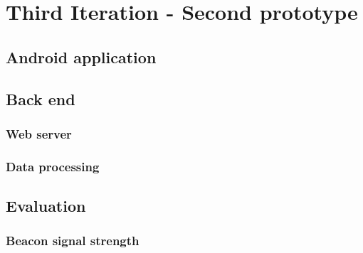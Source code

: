 \documentclass[../Main/thesis.tex]{subfiles}
\begin{document}
\chapter{Third Iteration  - Second prototype}
\label{ch:development-1}

\section{Android application}

\section{Back end}
\subsection{Web server}
\subsection{Data processing}

\section{Evaluation}
\subsection{Beacon signal strength}
\end{document}
